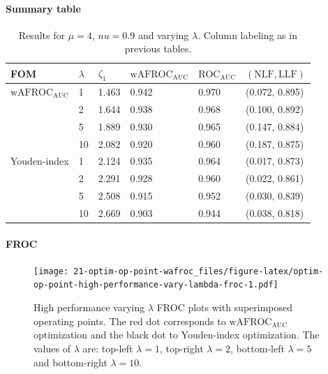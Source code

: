 \documentclass[
]{book}
\begin{document}
\hypertarget{summary-table-6}{%
\paragraph{Summary table}\label{summary-table-6}}

\begin{table}

\caption{\label{tab:optim-op-point-high-performance-vary-lambda-table}Results for $\mu = 4$, $nu = 0.9$ and varying $\lambda$. Column labeling as in previous tables.}
\centering
\fontsize{10}{12}\selectfont
\begin{tabular}[t]{llllll}
\toprule
FOM & $\lambda$ & $\zeta_1$ & $\text{wAFROC}_\text{AUC}$ & $\text{ROC}_\text{AUC}$ & $\left( \text{NLF}, \text{LLF}\right)$\\
\midrule
$\text{wAFROC}_\text{AUC}$ & 1 & 1.463 & 0.942 & 0.970 & (0.072, 0.895)\\
 & 2 & 1.644 & 0.938 & 0.968 & (0.100, 0.892)\\
 & 5 & 1.889 & 0.930 & 0.965 & (0.147, 0.884)\\
 & 10 & 2.082 & 0.920 & 0.960 & (0.187, 0.875)\\
Youden-index & 1 & 2.124 & 0.935 & 0.964 & (0.017, 0.873)\\
\addlinespace
 & 2 & 2.291 & 0.928 & 0.960 & (0.022, 0.861)\\
 & 5 & 2.508 & 0.915 & 0.952 & (0.030, 0.839)\\
 & 10 & 2.669 & 0.903 & 0.944 & (0.038, 0.818)\\
\bottomrule
\end{tabular}
\end{table}

\hypertarget{froc-7}{%
\paragraph{FROC}\label{froc-7}}

\begin{figure}
\centering
\texttt{[image: 21-optim-op-point-wafroc\_files/figure-latex/optim-op-point-high-performance-vary-lambda-froc-1.pdf]}
\caption{\label{fig:optim-op-point-high-performance-vary-lambda-froc}High performance varying \(\lambda\) FROC plots with superimposed operating points. The red dot corresponds to \(\text{wAFROC}_\text{AUC}\) optimization and the black dot to Youden-index optimization. The values of \(\lambda\) are: top-left \(\lambda = 1\), top-right \(\lambda = 2\), bottom-left \(\lambda = 5\) and bottom-right \(\lambda = 10\).}
\end{figure}
\end{document}
